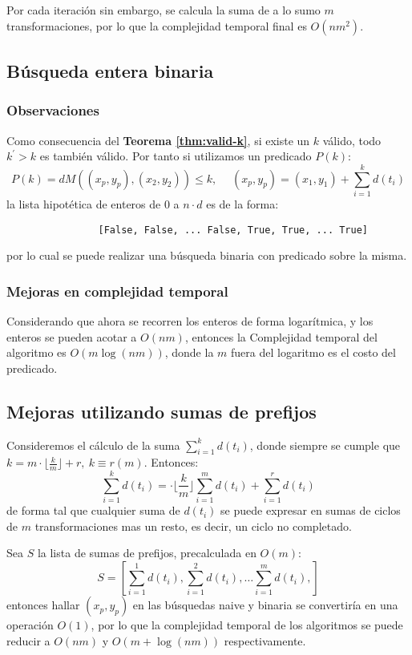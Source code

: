 \documentclass{article}
\theoremstyle{default}
\begin{document}
		Por cada iteración sin embargo, se calcula la suma de a lo sumo $m$ transformaciones, por lo que la complejidad temporal final es $O(nm^2)$.
%
%
\subsection{Búsqueda entera binaria}
	\subsubsection{Observaciones}
		Como consecuencia del \textbf{Teorema \ref{thm:valid-k}}, si existe un $k$ válido, todo $k^\prime > k$ es también válido. Por tanto si utilizamos un predicado $P(k)$:
		\begin{equation*}
			P(k) = dM((x_p,y_p), (x_2,y_2)) \leq k, \quad\; (x_p,y_p) = (x_1,y_1) + \sum\limits_{i=1}^{k}{d(t_i)}
		\end{equation*}
		la lista hipotética de enteros de $0$ a $n \cdot d$ es de la forma:
		\begin{verbatim}
		        [False, False, ... False, True, True, ... True]
		\end{verbatim}
		por lo cual se puede realizar una búsqueda binaria con predicado sobre la misma.
%
	\subsubsection{Mejoras en complejidad temporal}
		Considerando que ahora se recorren los enteros de forma logarítmica, y los enteros se pueden acotar a $O(nm)$, entonces la Complejidad temporal del algoritmo es $O(m\log(nm))$, donde la $m$ fuera del logaritmo es el costo del predicado.
%
%
\subsection{Mejoras utilizando sumas de prefijos}
	Consideremos el cálculo de la suma $\sum\limits_{i=1}^{k}{d(t_i)}$, donde siempre se cumple que $k = m\cdot\Big\lfloor\frac{k}{m}\Big\rfloor + r,\ k \equiv r(m)$. Entonces:
	\begin{equation*}
		\sum\limits_{i=1}^{k}{d(t_i)} 
			= \cdot \Bigg\lfloor\frac{k}{m}\Bigg\rfloor\sum\limits_{i=1}^{m}{d(t_i)}
			+ \sum\limits_{i=1}^{r}{d(t_i)}
	\end{equation*}
	de forma tal que cualquier suma de $d(t_i)$ se puede expresar en sumas de ciclos de $m$ transformaciones mas un resto, es decir, un ciclo no completado.

	Sea $S$ la lista de sumas de prefijos, precalculada en $O(m)$:
	\begin{equation*}
		S = \left[
		\sum\limits_{i=1}^{1}{d(t_i)},
		\sum\limits_{i=1}^{2}{d(t_i)},
		\dots
		\sum\limits_{i=1}^{m}{d(t_i)},
	\right]
	\end{equation*}
	entonces hallar $(x_p,y_p)$ en las búsquedas naive y binaria se convertiría en una operación $O(1)$, por lo que la complejidad temporal de los algoritmos se puede reducir a $O(nm)$ y $O(m + \log(nm))$ respectivamente.
%
%
\end{document}
